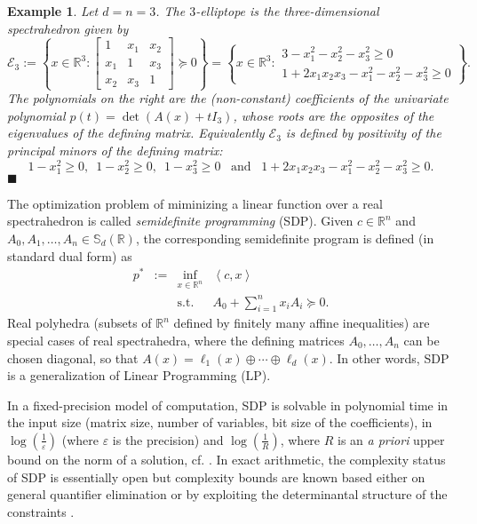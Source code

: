 \documentclass[a4paper,12pt]{article}
\newtheorem{example}{Example}
\newcommand{\R}{\mathbb{R}} %
\newcommand{\sym}{\mathbb{S}} %
\newcommand{\exend}{\hfill $\blacksquare$}
\begin{document}
\begin{example}\label{ell3}
  Let $d=n=3$. The $3$-elliptope is the three-dimensional spectrahedron given by
  $$
  \mathcal{E}_3 :=
  \left\{
  x
  \in \R^3 :
  \begin{bmatrix}
    1 & x_1 & x_2 \\
    x_1 & 1 & x_3 \\
    x_2 & x_3 & 1
  \end{bmatrix}
  \succeq 0
  \right\}
  =
  \left\{
  x
  \in \R^3 :
  \begin{array}{r}
    3-x_1^2-x_2^2-x_3^2 \geq 0 \\
    1+2x_1x_2x_3-x_1^2-x_2^2-x_3^2 \geq 0
  \end{array}
  \right\}.
  $$
  The polynomials on the right are the (non-constant) coefficients of the univariate polynomial
  $p(t) = \det(A(x)+t I_3)$,
  whose roots are the opposites of the eigenvalues of the defining matrix. Equivalently $\mathcal{E}_3$
  is defined by positivity of the principal minors of the defining matrix:
  $$
  1-x_1^2 \geq 0, \,\,\, 1-x_2^2 \geq 0, \,\,\, 1-x_3^2 \geq 0 \,\,\, \text{ and } \,\,\, 1+2x_1x_2x_3-x_1^2-x_2^2-x_3^2 \geq 0.$$ \exend
\end{example}

The optimization problem of miminizing a linear function over a real spectrahedron is called \emph{semidefinite programming} (SDP). Given $c \in \R^n$ and $A_0,A_1,\ldots,A_n \in \sym_d(\R)$, the corresponding semidefinite program is defined (in standard dual form) as
\begin{equation}
  \label{SDP}
\begin{array}{rcll}
  p^* & := & \inf_{x \in \R^n} & \left\langle c, x \right\rangle \\
  &    & \text{s.t.}         & A_0+\sum_{i=1}^n x_i A_i \succeq 0.
\end{array}
\end{equation}
Real polyhedra (subsets of $\R^n$ defined by finitely many affine inequalities) are special cases of real
spectrahedra, where the defining matrices $A_0, \ldots, A_n$ can be chosen diagonal, so that $A(x) =
\ell_1(x) \oplus \cdots \oplus \ell_d(x)$. In other words, SDP is a generalization of Linear Programming (LP).

In a fixed-precision model of computation, SDP is solvable in polynomial time in the input size (matrix size,
number of variables, bit size of the coefficients), in $\log(\frac{1}{\varepsilon})$ (where $\varepsilon$ is the
precision) and $\log(\frac{1}{R})$, where $R$ is an {\it a priori} upper bound on the norm of a solution,
cf. \cite[Sec.1.9]{deKlerk}. In exact arithmetic, the complexity status of SDP is essentially open but complexity
bounds are known based either on general quantifier elimination \cite{ramana1997exact,porkolab1997complexity}
or by exploiting the determinantal structure of the constraints \cite{henrion2016exact}.
\end{document}
